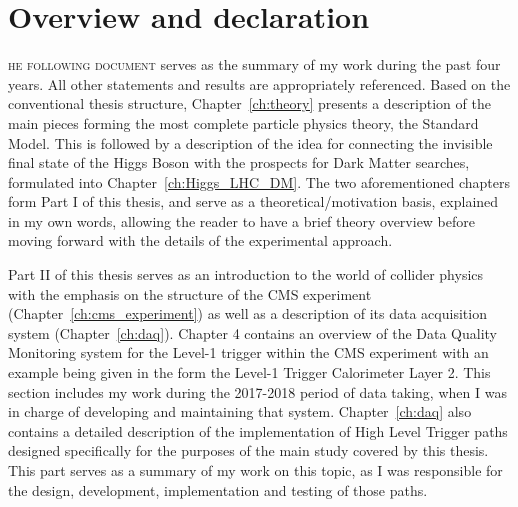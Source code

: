 \chapter*{Overview and declaration}
\mediumlinespacing

\hspace{10pt}\lettrine[lines=2]{}{he following document} serves as the summary of my work during the past four years. All other statements and results are appropriately referenced. Based on the conventional thesis structure, Chapter~\ref{ch:theory} presents a description of the main pieces forming the most complete particle physics theory, the Standard Model. This is  followed by a description of the idea for connecting the invisible final state of the Higgs Boson with the prospects for Dark Matter searches, formulated into Chapter~\ref{ch:Higgs_LHC_DM}. The two aforementioned chapters form Part I of this thesis, and serve as a theoretical/motivation basis, explained in my own words, allowing the reader to have a brief theory overview before moving forward with the details of the experimental approach. 

\hspace{10pt} Part II of this thesis serves as an introduction to the world of collider physics with the emphasis on the structure of the CMS experiment (Chapter~\ref{ch:cms_experiment}) as well as a description of its data acquisition system (Chapter~\ref{ch:daq}). Chapter 4 contains an overview of the Data Quality Monitoring system for the Level-1 trigger within the CMS experiment with an example being given in the form the Level-1 Trigger Calorimeter Layer 2. This section includes my work during the 2017-2018 period of data taking, when I was in charge of developing and maintaining that system. Chapter~\ref{ch:daq} also contains a detailed description of the implementation of High Level Trigger paths designed specifically for the purposes of the main study covered by this thesis. This part serves as a summary of my work on this topic, as I was responsible for the design, development, implementation and testing of those paths.

